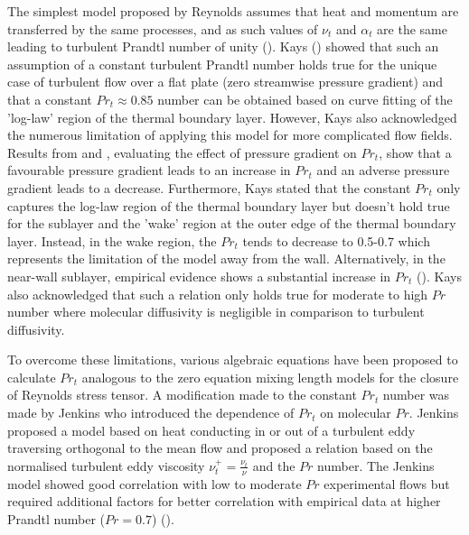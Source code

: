 \noindent The simplest model proposed by Reynolds assumes that heat and momentum are transferred by the same processes, and as such values of $\nu_{t}$ and $\alpha_{t}$ are the same leading to turbulent Prandtl number of unity (\cite{Cebeci1973}). Kays (\cite{Kays1994}) showed that such an assumption of a constant turbulent Prandtl number holds true for the unique case of turbulent flow over a flat plate (zero streamwise pressure gradient) and that a constant $Pr_{t} \approx 0.85$  number can be obtained based on curve fitting of the 'log-law' region of the thermal boundary layer. However, Kays also acknowledged the numerous limitation of applying this model for more complicated flow fields. Results from \cite{Blackwell1972} and \cite{Roganov1984}, evaluating the effect of pressure gradient on $Pr_{t}$, show that a favourable pressure gradient leads to an increase in $Pr_{t}$ and an adverse pressure gradient leads to a decrease. Furthermore, Kays stated that the constant $Pr_{t}$ only captures the log-law region of the thermal boundary layer but doesn't hold true for the sublayer and the 'wake' region at the outer edge of the thermal boundary layer. Instead, in the wake region, the $Pr_{t}$ tends to decrease to 0.5-0.7 which represents the limitation of the model away from the wall. Alternatively, in the near-wall sublayer, empirical evidence shows a substantial increase in $Pr_{t}$ (\cite{Yoder2016}). Kays also acknowledged that such a relation only holds true for moderate to high $Pr$ number where molecular diffusivity is negligible in comparison to turbulent diffusivity.

\noindent To overcome these limitations, various algebraic equations have been proposed to calculate $Pr_{t}$ analogous to the zero equation mixing length models for the closure of Reynolds stress tensor. A modification made to the constant $Pr_{t}$ number was made by Jenkins who introduced the dependence of $Pr_{t}$ on molecular $Pr$. Jenkins proposed a model based on heat conducting in or out of a turbulent eddy traversing orthogonal to the mean flow and proposed a relation based on the normalised turbulent eddy viscosity $\nu_{t}^{+} = \frac{\nu_{t}}{\nu}$ and the $Pr$ number. The Jenkins model showed good correlation with low to moderate $Pr$ experimental flows but required additional factors for better correlation with empirical data at higher Prandtl number ($Pr = 0.7$) (\cite{Cebeci1973}).


